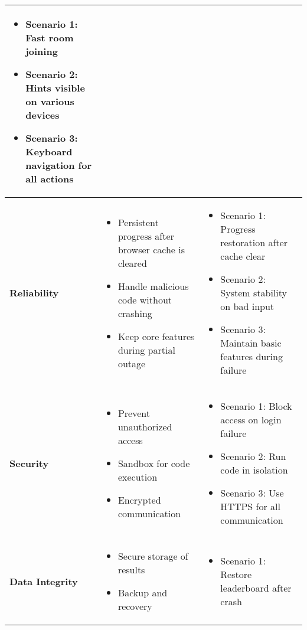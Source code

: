 \begin{longtable}{|p{4.2cm}|p{6.8cm}|p{5.8cm}|}
    \begin{itemize}
        \item Scenario 1: Fast room joining
        \item Scenario 2: Hints visible on various devices
        \item Scenario 3: Keyboard navigation for all actions
    \end{itemize} \\
    \hline
    \textbf{Reliability} &
    \begin{itemize}
        \item Persistent progress after browser cache is cleared
        \item Handle malicious code without crashing
        \item Keep core features during partial outage
    \end{itemize} &
    \begin{itemize}
        \item Scenario 1: Progress restoration after cache clear
        \item Scenario 2: System stability on bad input
        \item Scenario 3: Maintain basic features during failure
    \end{itemize} \\
    \hline
    \textbf{Security} &
    \begin{itemize}
        \item Prevent unauthorized access
        \item Sandbox for code execution
        \item Encrypted communication
    \end{itemize} &
    \begin{itemize}
        \item Scenario 1: Block access on login failure
        \item Scenario 2: Run code in isolation
        \item Scenario 3: Use HTTPS for all communication
    \end{itemize} \\
    \hline
    \textbf{Data Integrity} &
    \begin{itemize}
        \item Secure storage of results
        \item Backup and recovery
    \end{itemize} &
    \begin{itemize}
        \item Scenario 1: Restore leaderboard after crash

\end{itemize}
\end{longtable}
